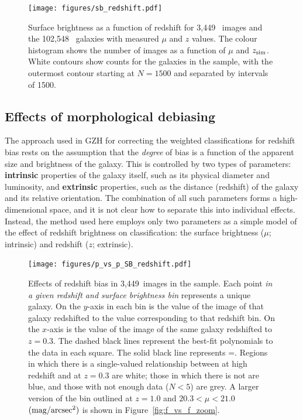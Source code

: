 \documentclass[a4paper,fleqn,usenatbib]{mnras}
\begin{document}
\begin{figure}
\begin{center}
\texttt{[image: figures/sb\_redshift.pdf]}
\caption{Surface brightness as a function of redshift for 3,449~\ferengi{}
images and the 102,548~\main{} galaxies with measured $\mu$ and $z$ values. The
colour histogram shows the number of \ferengi{} images as a function of $\mu$
and $z_{\rm sim}$. White contours show counts for the galaxies in the \main{}
sample, with the outermost contour starting at $N=1500$ and separated by
intervals of 1500.} 
\label{fig:sb_redshift}
\end{center}
\end{figure}


\subsection{Effects of morphological debiasing}\label{ssec:zeta_results}
The approach used in GZH for correcting the weighted classifications for
redshift bias rests on the assumption that the \emph{degree} of bias is a
function of the apparent size and brightness of the galaxy.
This is controlled by two types of parameters: \textbf{intrinsic} properties of
the galaxy itself, such as its physical diameter and luminosity, and
\textbf{extrinsic} properties, such as the distance (redshift) of the galaxy
and its relative orientation. The combination of all
such parameters forms a high-dimensional space, and it is not clear how to
separate this into individual effects. Instead, the method used here employs
only two parameters as a simple model of the effect of redshift brightness on classification: the
surface brightness ($\mu$; intrinsic) and redshift ($z$;
extrinsic).


\begin{figure}
\centering
\texttt{[image: figures/p\_vs\_p\_SB\_redshift.pdf]}
\caption{Effects of redshift bias in 3,449~images in the \ferengi{} sample.
Each point \emph{in a given redshift and surface brightness bin} represents a
unique galaxy. On the $y$-axis in each bin is the \ffeatures{} value of the
image of that galaxy redshifted to the value corresponding to that redshift
bin. On the $x$-axis is the \ffeatures{} value of the image of the same galaxy
redshifted to $z=0.3$. The dashed black lines represent the best-fit
polynomials to the data in each square. The solid black line represents
\ffeaturesz=\ffeaturesrest. Regions in which there is a single-valued
relationship between \ffeatures{} at high redshift and at $z=0.3$ are white;
those in which there is not are blue, and those with not enough data ($N<5$)
are grey. A larger version of the bin outlined at $z=1.0$ and $20.3 < \mu <
21.0$ $\rm (mag/arcsec^2)$ is shown in Figure~\ref{fig:f_vs_f_zoom}.}
\label{fig:f_vs_f}
\end{figure} 
\end{document}
